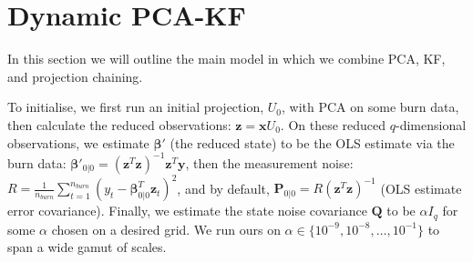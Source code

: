 \section{Dynamic PCA-KF}\label{sec:dynamicfk}
In this section we will outline the main model in which we combine PCA, KF, and projection chaining.

To initialise, we first run an initial projection, $U_0$, with PCA on some burn data, then calculate the reduced observations: $\bm{z}=\bm{x}U_0$. On these reduced $q$-dimensional observations, we estimate $\bm{\beta}'$ (the reduced state) to be the OLS estimate via the burn data: $\bm{\beta}'_{0|0}=(\bm{z}^T\bm{z})^{-1}\bm{z}^T \bm{y}$, then the measurement noise: $R = \frac{1}{n_{burn}}\sum_{t=1}^{n_{burn}}(y_t-\bm{\beta}_{0|0}^T \bm{z}_t)^2$, and by default, $\bm{P}_{0|0} = R(\bm{z}^T \bm{z})^{-1}$ (OLS estimate error covariance). Finally, we estimate the state noise covariance $\bm{Q}$ to be $\alpha I_q$ for some $\alpha$ chosen on a desired grid. We run ours on $\alpha\in \{10^{-9}, 10^{-8}, \dots, 10^{-1}\}$ to span a wide gamut of scales.

